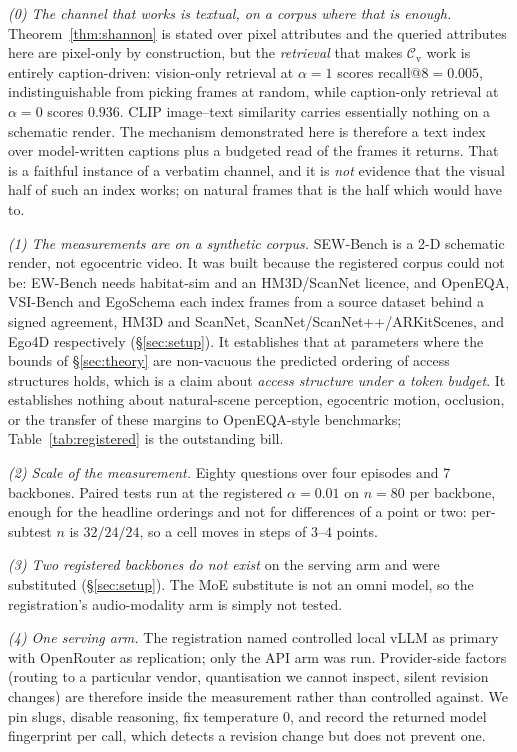 \documentclass[10pt]{article}
\newcommand{\VnBackbones}{seven}
\providecommand{\VnBackbones}{--}
\renewcommand{\VnBackbones}{7}
\theoremstyle{definition}
\theoremstyle{plain}
\newcommand{\cv}{\mathcal{C}_{\mathrm{v}}}
\begin{document}
\emph{(0) The channel that works is textual, on a corpus where that is enough.} Theorem~\ref{thm:shannon} is stated over pixel attributes and the queried attributes here are pixel-only by construction, but the \emph{retrieval} that makes $\cv$ work is entirely caption-driven: vision-only retrieval at $\alpha{=}1$ scores recall@$8=0.005$, indistinguishable from picking frames at random, while caption-only retrieval at $\alpha{=}0$ scores $0.936$. CLIP image--text similarity carries essentially nothing on a schematic render. The mechanism demonstrated here is therefore a text index over model-written captions plus a budgeted read of the frames it returns. That is a faithful instance of a verbatim channel, and it is \emph{not} evidence that the visual half of such an index works; on natural frames that is the half which would have to.

\emph{(1) The measurements are on a synthetic corpus.} SEW-Bench is a 2-D schematic render, not egocentric video. It was built because the registered corpus could not be: EW-Bench needs habitat-sim and an HM3D/ScanNet licence, and OpenEQA, VSI-Bench and EgoSchema each index frames from a source dataset behind a signed agreement, HM3D and ScanNet, ScanNet/ScanNet++/ARKitScenes, and Ego4D respectively (\S\ref{sec:setup}). It establishes that at parameters where the bounds of \S\ref{sec:theory} are non-vacuous the predicted ordering of access structures holds, which is a claim about \emph{access structure under a token budget}. It establishes nothing about natural-scene perception, egocentric motion, occlusion, or the transfer of these margins to OpenEQA-style benchmarks; Table~\ref{tab:registered} is the outstanding bill.

\emph{(2) Scale of the measurement.} Eighty questions over four episodes and \VnBackbones{} backbones. Paired tests run at the registered $\alpha{=}0.01$ on $n{=}80$ per backbone, enough for the headline orderings and not for differences of a point or two: per-subtest $n$ is $32/24/24$, so a cell moves in steps of $3$--$4$ points.

\emph{(3) Two registered backbones do not exist} on the serving arm and were substituted (\S\ref{sec:setup}). The MoE substitute is not an omni model, so the registration's audio-modality arm is simply not tested.

\emph{(4) One serving arm.} The registration named controlled local vLLM as primary with OpenRouter as replication; only the API arm was run. Provider-side factors (routing to a particular vendor, quantisation we cannot inspect, silent revision changes) are therefore inside the measurement rather than controlled against. We pin slugs, disable reasoning, fix temperature $0$, and record the returned model fingerprint per call, which detects a revision change but does not prevent one.
\end{document}
